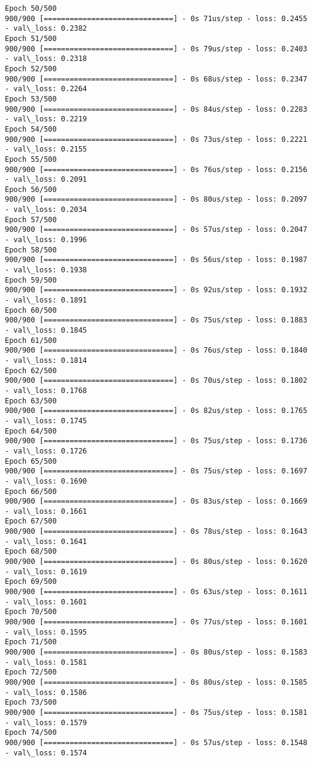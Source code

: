 \documentclass[11pt]{article}
\begin{document}
\begin{Verbatim}[commandchars=\\\{\}]
Epoch 50/500
900/900 [==============================] - 0s 71us/step - loss: 0.2455 - val\_loss: 0.2382
Epoch 51/500
900/900 [==============================] - 0s 79us/step - loss: 0.2403 - val\_loss: 0.2318
Epoch 52/500
900/900 [==============================] - 0s 68us/step - loss: 0.2347 - val\_loss: 0.2264
Epoch 53/500
900/900 [==============================] - 0s 84us/step - loss: 0.2283 - val\_loss: 0.2219
Epoch 54/500
900/900 [==============================] - 0s 73us/step - loss: 0.2221 - val\_loss: 0.2155
Epoch 55/500
900/900 [==============================] - 0s 76us/step - loss: 0.2156 - val\_loss: 0.2091
Epoch 56/500
900/900 [==============================] - 0s 80us/step - loss: 0.2097 - val\_loss: 0.2034
Epoch 57/500
900/900 [==============================] - 0s 57us/step - loss: 0.2047 - val\_loss: 0.1996
Epoch 58/500
900/900 [==============================] - 0s 56us/step - loss: 0.1987 - val\_loss: 0.1938
Epoch 59/500
900/900 [==============================] - 0s 92us/step - loss: 0.1932 - val\_loss: 0.1891
Epoch 60/500
900/900 [==============================] - 0s 75us/step - loss: 0.1883 - val\_loss: 0.1845
Epoch 61/500
900/900 [==============================] - 0s 76us/step - loss: 0.1840 - val\_loss: 0.1814
Epoch 62/500
900/900 [==============================] - 0s 70us/step - loss: 0.1802 - val\_loss: 0.1768
Epoch 63/500
900/900 [==============================] - 0s 82us/step - loss: 0.1765 - val\_loss: 0.1745
Epoch 64/500
900/900 [==============================] - 0s 75us/step - loss: 0.1736 - val\_loss: 0.1726
Epoch 65/500
900/900 [==============================] - 0s 75us/step - loss: 0.1697 - val\_loss: 0.1690
Epoch 66/500
900/900 [==============================] - 0s 83us/step - loss: 0.1669 - val\_loss: 0.1661
Epoch 67/500
900/900 [==============================] - 0s 78us/step - loss: 0.1643 - val\_loss: 0.1641
Epoch 68/500
900/900 [==============================] - 0s 80us/step - loss: 0.1620 - val\_loss: 0.1619
Epoch 69/500
900/900 [==============================] - 0s 63us/step - loss: 0.1611 - val\_loss: 0.1601
Epoch 70/500
900/900 [==============================] - 0s 77us/step - loss: 0.1601 - val\_loss: 0.1595
Epoch 71/500
900/900 [==============================] - 0s 80us/step - loss: 0.1583 - val\_loss: 0.1581
Epoch 72/500
900/900 [==============================] - 0s 80us/step - loss: 0.1585 - val\_loss: 0.1586
Epoch 73/500
900/900 [==============================] - 0s 75us/step - loss: 0.1581 - val\_loss: 0.1579
Epoch 74/500
900/900 [==============================] - 0s 57us/step - loss: 0.1548 - val\_loss: 0.1574

\end{Verbatim}
\end{document}
